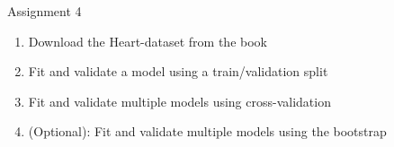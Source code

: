 \begin{frame}{Assignment 4}
    \begin{enumerate}
        \item Download the Heart-dataset from the book
        \item Fit and validate a model using a train/validation split
        \item Fit and validate multiple models using cross-validation
        \item (Optional): Fit and validate multiple models using the bootstrap
    \end{enumerate}
\end{frame}